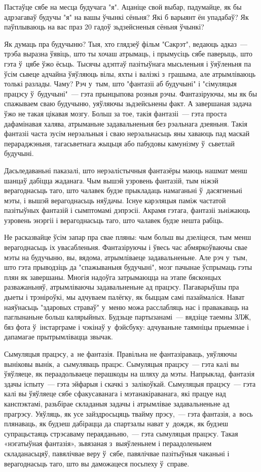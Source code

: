 Пастаўце сябе на месца будучага "я". Ацаніце свой выбар, падумайце, як бы адрэагаваў будучы "я" на вашы ўчынкі сёньня? Які б варыянт ён упадабаў? Як паўплываюць на вас праз 20 гадоў зьдзейсненыя сёньня ўчынкі?

Як думаць пра будучыню? Тыя, хто глядзеў фільм "Сакрэт", ведаюць адказ~--- трэба выразна ўявіць, што ты хочаш атрымаць, і прымусіць сябе паверыць, што гэта ў~цябе ўжо ёсьць. Тысячы адэптаў пазітыўнага мысьленьня і ўяўленьня па ўсім сьвеце адчайна ўяўляюць вілы, яхты і валізкі з~грашыма, але атрымліваюць толькі разлады. Чаму? Рэч у~тым, што "фантазіі аб будучыні" і "сімуляцыя працэсу ў~будучыні"~--- гэта прынцыпова розныя рэчы. Фантазіруючы, мы як бы спажываем сваю будучыню, уяўляючы зьдзейсьнены факт. А завершаная задача ўжо не такая цікавая мозгу. Больш за тое, такія фантазіі~--- гэта проста дафамінавая халява, атрыманьне задавальненьня без рэальнага дзеяньня. Такія фантазіі часта зусім нерэальныя і сваю нерэальнасьць яны хаваюць пад маскай перараджэньня, тагасьветнага жыцьця або пабудовы камунізму ў~сьветлай будучыні.

Дасьледаваньні паказалі, што нерэалістычныя фантазёры маюць нашмат менш шанцаў дабіцца жаданага. Чым вышэй узровень фантазій, тым ніжэй верагоднасьць таго, што чалавек будзе прыкладаць намаганьні ў~дасягненьні мэты, і вышэй верагоднасьць няўдачы. Існуе карэляцыя паміж частатой пазітыўных фантазій і сымптомамі дэпрэсіі. Акрамя гэтага, фантазіі зьніжаюць узровень энэргіі і верагоднасьць таго, што чалавек будзе нешта рабіць.

Не расказвайце ўсім запар пра свае пляны: чым больш вы дзеліцеся, тым менш верагоднасьць іх увасабленьня. Фантазіруючы і ўвесь час абмяркоўваючы свае мэты на будучыню, вы, вядома, атрымліваеце задавальненьне. Але рэч у~тым, што гэта прыводзіць да "спажываньня будучыні", мозг пачынае ўспрымаць гэты плян як завершаны. Многія надоўга затрымаюцца на этапе бясконцых разважаньняў, атрымліваючы задавальненьне ад працэсу. Пагаварыўшы пра дыеты і трэніроўкі, мы адчуваем палёгку, як быццам самі пазаймаліся. Нават наяўнасьць "здаровых страваў" у~меню можа расслабляць нас і правакаваць на паглынаньне больш калярыйных. Будзьце партызанамі~--- вядзіце таемны ЗЛЖ, бяз фота ў~інстарграме і чэкінаў у~фэйсбуку: адчуваньне таямніцы прыемнае і дапамагае прытрымлівацца звычак.

Сымуляцыя працэсу, а~не фантазія. Правільна не фантазіраваць, уяўляючы выніковы вынік, а~сымуляваць працэс. Сымуляцыя працэсу~--- гэта калі вы ўяўляеце, як пераадольваеце перашкоды на шляху да мэты. Напрыклад, фантазія здачы іспыту~--- гэта эйфарыя і скачкі з~залікоўкай. Сымуляцыя працэсу~--- гэта калі вы ўяўляеце сябе сфакусаванага і мэтанакіраванага, які працуе над канспэктамі, разьбірае складаныя задачы і атрымлівае задавальненьне ад прагрэсу. Уяўляць, як усе зайздросьцяць твайму прэсу,~--- гэта фантазія, а~вось плянаваць, як будзеш дабірацца да спартзалы нават у~дождж, як будзеш супрацьстаяць стрэсаваму пераяданьню,~--- гэта сымуляцыя працэсу. Такая «нэгатыўная фантазія», зьвязаная з~выяўленьнем і пераадоленьнем складанасьцяў, павялічвае веру ў~сябе, павялічвае пазітыўныя чаканьні і верагоднасьць таго, што вы даможацеся посьпеху ў~справе.

